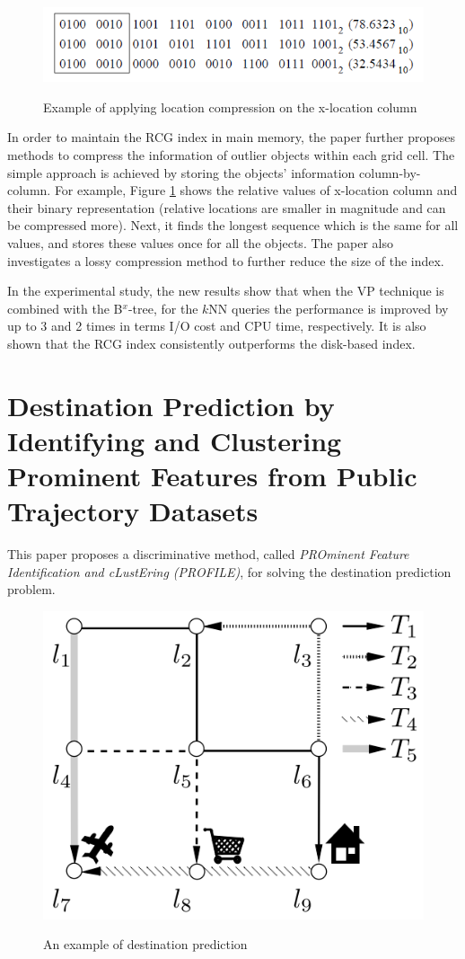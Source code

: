\documentclass[paper=a4, fontsize=18pt]{article} %
\numberwithin{equation}{section} %
\numberwithin{figure}{section} %
\numberwithin{table}{section} %
\begin{document}
\begin{figure}[h]
  \centering
  \includegraphics[width=.7\linewidth]{9_12_VP2.png}\\
  \caption{Example of applying location compression on the x-location column}\label{fig:VP2}
\end{figure}

In order to maintain the RCG index in main memory, the paper further proposes methods to compress the information of outlier objects within each grid cell. The simple approach is achieved by storing the objects' information column-by-column. For example, Figure \ref{fig:VP2} shows the relative values of x-location column and their binary representation (relative locations are smaller in magnitude and can be compressed more). Next, it finds the longest sequence which is the same for all values, and stores these values once for all the objects. The paper also investigates a lossy compression method to further reduce the size of the index.

In the experimental study, the new results show that when the VP technique is combined with the B$^x$-tree, for the $k$NN queries the performance is improved by up to 3 and 2 times in terms I/O cost and CPU time, respectively. It is also shown that the RCG  index consistently outperforms the disk-based index.

\section{Destination Prediction by Identifying and Clustering Prominent Features from Public Trajectory Datasets \cite{YXLZ15}}

This paper proposes a discriminative method, called \emph{PROminent Feature Identification and cLustEring (PROFILE)}, for solving the destination prediction problem.

 \begin{figure}[h]
  \centering
  \includegraphics[width=.6\linewidth]{7_25_dest_pred.png}\\
  \caption{An example of destination prediction}\label{fig:dest}
\end{figure}
\end{document}
